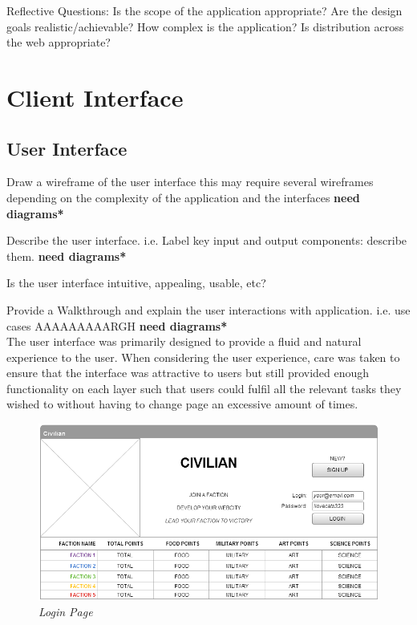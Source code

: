 \documentclass{sig-alt-release2}
\begin{document}
Reflective Questions: 
Is the scope of the application appropriate? 
Are the design goals realistic/achievable? 
How complex is the application? 
Is distribution across the web appropriate? 

\section{Client Interface}

\subsection{User Interface}

Draw a wireframe of the user interface 
this may require several wireframes depending on the complexity of the application and the interfaces {\bf *need diagrams*} 

Describe the user interface.
i.e. Label key input and output components: describe them. {\bf *need diagrams*} 

Is the user interface intuitive, appealing, usable, etc?

Provide a Walkthrough and explain the user interactions with application. 
i.e. use cases AAAAAAAAARGH {\bf *need diagrams*} \\

The user interface was primarily designed to provide a fluid and natural experience to the user. When considering the user experience, care was taken to ensure that the interface was attractive to users but still provided enough functionality on each layer such that users could fulfil all the relevant tasks they wished to without having to change page an excessive amount of times. \\

\begin{figure}[!htbp]
  \caption{\textit{Login Page}}
  \begin{center}
		\includegraphics[scale=0.25]{img/w3.png}
  \end{center}
\end{figure}
\end{document}
